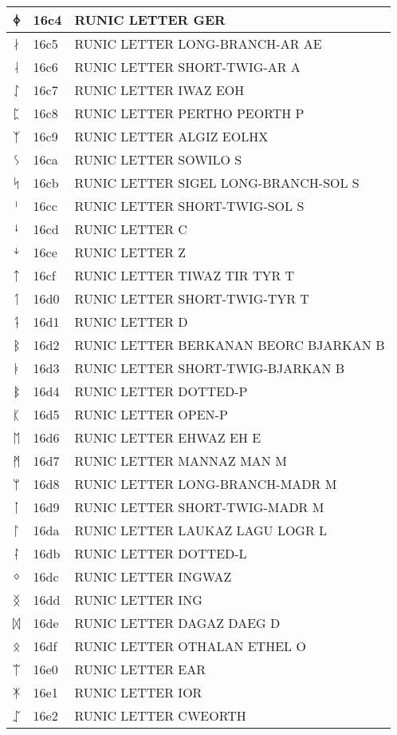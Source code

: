 \documentclass[12pt,letterpaper,openany]{book}
\begin{document}
\begin{center}
\begin{supertabular}{|m{0.25in}|m{0.5in}|m{4in}|}
ᛄ & 16c4 & RUNIC LETTER GER\\\hline
ᛅ & 16c5 & RUNIC LETTER LONG-BRANCH-AR AE\\\hline
ᛆ & 16c6 & RUNIC LETTER SHORT-TWIG-AR A\\\hline
ᛇ & 16c7 & RUNIC LETTER IWAZ EOH\\\hline
ᛈ & 16c8 & RUNIC LETTER PERTHO PEORTH P\\\hline
ᛉ & 16c9 & RUNIC LETTER ALGIZ EOLHX\\\hline
ᛊ & 16ca & RUNIC LETTER SOWILO S\\\hline
ᛋ & 16cb & RUNIC LETTER SIGEL LONG-BRANCH-SOL S\\\hline
ᛌ & 16cc & RUNIC LETTER SHORT-TWIG-SOL S\\\hline
ᛍ & 16cd & RUNIC LETTER C\\\hline
ᛎ & 16ce & RUNIC LETTER Z\\\hline
ᛏ & 16cf & RUNIC LETTER TIWAZ TIR TYR T\\\hline
ᛐ & 16d0 & RUNIC LETTER SHORT-TWIG-TYR T\\\hline
ᛑ & 16d1 & RUNIC LETTER D\\\hline
ᛒ & 16d2 & RUNIC LETTER BERKANAN BEORC BJARKAN B\\\hline
ᛓ & 16d3 & RUNIC LETTER SHORT-TWIG-BJARKAN B\\\hline
ᛔ & 16d4 & RUNIC LETTER DOTTED-P\\\hline
ᛕ & 16d5 & RUNIC LETTER OPEN-P\\\hline
ᛖ & 16d6 & RUNIC LETTER EHWAZ EH E\\\hline
ᛗ & 16d7 & RUNIC LETTER MANNAZ MAN M\\\hline
ᛘ & 16d8 & RUNIC LETTER LONG-BRANCH-MADR M\\\hline
ᛙ & 16d9 & RUNIC LETTER SHORT-TWIG-MADR M\\\hline
ᛚ & 16da & RUNIC LETTER LAUKAZ LAGU LOGR L\\\hline
ᛛ & 16db & RUNIC LETTER DOTTED-L\\\hline
ᛜ & 16dc & RUNIC LETTER INGWAZ\\\hline
ᛝ & 16dd & RUNIC LETTER ING\\\hline
ᛞ & 16de & RUNIC LETTER DAGAZ DAEG D\\\hline
ᛟ & 16df & RUNIC LETTER OTHALAN ETHEL O\\\hline
ᛠ & 16e0 & RUNIC LETTER EAR\\\hline
ᛡ & 16e1 & RUNIC LETTER IOR\\\hline
ᛢ & 16e2 & RUNIC LETTER CWEORTH\\\hline

\end{supertabular}
\end{center}
\end{document}
